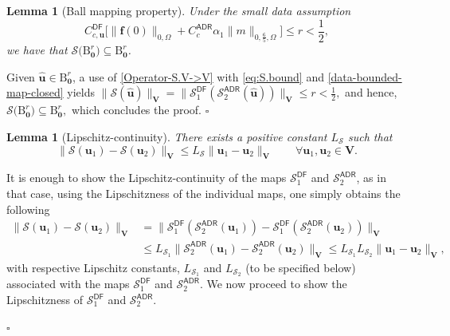 \documentclass[11pt, reqno, a4paper, twoside]{article}
\newcommand{\bu}{\boldsymbol{u}}
\renewcommand{\bf}{\boldsymbol{f}}
\newcommand\bzero{\boldsymbol{0}}
\newcommand{\bV}{\mathbf{V}}
\newcommand{\cS}{\mathcal{S}}
\newtheorem{lemma}[theorem]{Lemma}
\newenvironment{proof}{\noindent{\it Proof.}}{\hfill$\square$}
\numberwithin{equation}{section}
\numberwithin{remark}{section}
\numberwithin{figure}{section}
\numberwithin{table}{section}
\begin{document}
{\begin{lemma}[Ball mapping property]\label{lemma:ball}
Under the small data assumption 
\begin{equation}\label{data-bounded-map-closed}
{C^{\mathsf{DF}}_{c,\bu}}\bigl[{\|\bf(0)\|_{0,\Omega}}+C^{\mathsf{ADR}}_{c}\alpha_1\|m\|_{0,\frac65,\Omega}\bigr] \leq r<\frac12,
\end{equation}
we have that $\cS\big(\mathrm{B}_{\bzero}^r\big)\subseteq\mathrm{B}_{\bzero}^r$.
\end{lemma}
\begin{proof}
  Given $\hat{\bu} \in \mathrm{B}_{\bzero}^r$, a use of  \eqref{Operator-S.V->V} with  \eqref{eq:S.bound} and \eqref{data-bounded-map-closed}  yields
     \(
         \|\cS(\hat{\bu})\|_{\bV}= \|  \cS^{\mathsf{DF}}_1(\cS^{\mathsf{ADR}}_2(\hat{\bu}))\|_{\bV}
         \leq r<\frac12,
     \)  
     and hence, $\cS\big(\mathrm{B}_{\bzero}^r\big)\subseteq\mathrm{B}_{\bzero}^r,$ which concludes the proof.
\end{proof}
 \begin{lemma}[Lipschitz-continuity]\label{lemma:continuity-S} 
 There exists a positive constant $L_{\cS}$ such that 
 \begin{equation}\label{continuity-S}
  \|\cS(\bu_{1})-\cS(\bu_{2})\|_{\bV}
\leq L_{\cS}\|\bu_{1}-\bu_{2}\|_{\bV} \qquad \forall \bu_1,\bu_2 \in \bV.
 \end{equation} 
 \end{lemma}
\begin{proof}
It is enough to show the Lipschitz-continuity of the maps \(\cS_1^{\mathsf{DF}}\) and \(\cS_2^{\mathsf{ADR}}\), as in that case, using the Lipschitzness of the individual maps, one simply obtains the following 
\begin{align*}\|\cS(\bu_{1})-\cS(\bu_{2})\|_{\bV}&=\|\cS_1^{\mathsf{DF}}(\cS_2^{\mathsf{ADR}}(\bu_1))-\cS_1^{\mathsf{DF}}(\cS_2^{\mathsf{ADR}}(\bu_2))\|_{\bV}\\
&\leq L_{\cS_1}\|\cS_2^{\mathsf{ADR}}(\bu_1)-\cS_2^{\mathsf{ADR}}(\bu_2)\|_{\bV}\leq L_{\cS_1}L_{\cS_2}\|\bu_1-\bu_2\|_{\bV},
\end{align*}
with respective Lipschitz constants, \(L_{\cS_1}\) and \(L_{\cS_2}\) (to be specified below) associated {with} {the maps} \(\cS^{\mathsf{DF}}_1\) and \(\cS^{\mathsf{ADR}}_2\). We now proceed to show the Lipschitzness of \(\cS_1^{\mathsf{DF}}\) and \(\cS_2^{\mathsf{ADR}}\).


\end{proof}}
\end{document}
